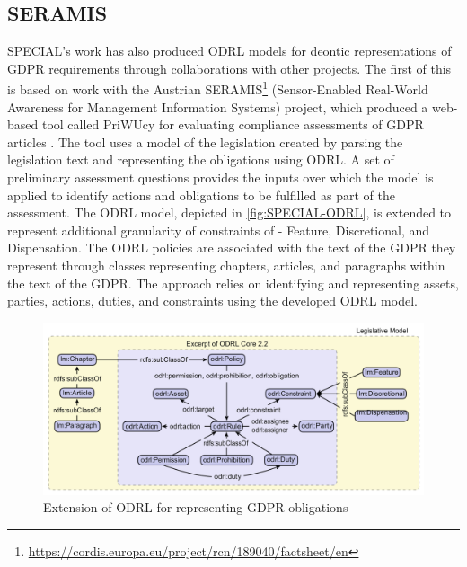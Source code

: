 \subsection*{SERAMIS}
SPECIAL's work has also produced ODRL models for deontic representations of GDPR requirements through collaborations with other projects. The first of this is based on work with the Austrian SERAMIS\footnote{\url{https://cordis.europa.eu/project/rcn/189040/factsheet/en}} (Sensor-Enabled Real-World Awareness for Management Information Systems) project, which produced a web-based tool called PriWUcy for evaluating compliance assessments of GDPR articles \cite{agarwal_d5.5_2017,agarwal_legislative_2018}.
The tool uses a model of the legislation created by parsing the legislation text and representing the obligations using ODRL. A set of preliminary assessment questions provides the inputs over which the model is applied to identify actions and obligations to be fulfilled as part of the assessment. The ODRL model, depicted in \autoref{fig:SPECIAL-ODRL}, is extended to represent additional granularity of constraints of - Feature, Discretional, and Dispensation. The ODRL policies are associated with the text of the GDPR they represent through classes representing chapters, articles, and paragraphs within the text of the GDPR. The approach relies on identifying and representing assets, parties, actions, duties, and constraints using the developed ODRL model.
\begin{figure}[htbp]
    \centering
    \includegraphics[width=\linewidth]{img/SPECIAL_ODRL.png}
    \caption{Extension of ODRL for representing GDPR obligations \cite{agarwal_legislative_2018}}
    \label{fig:SPECIAL-ODRL}
\end{figure}

